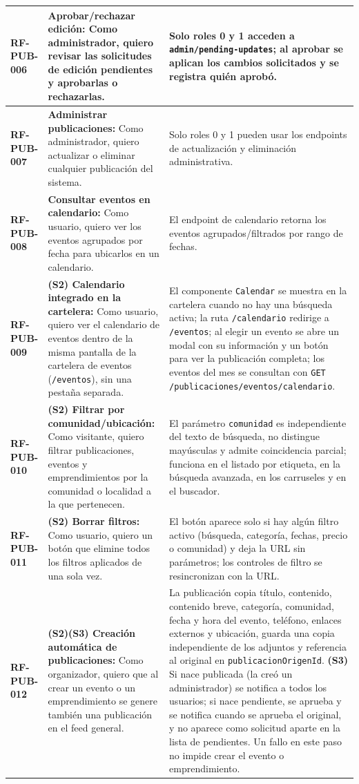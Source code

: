 \begin{longtable}{|l||p{7cm}|p{4.5cm}|}
\hline
\textbf{RF-PUB-006} & \textbf{Aprobar/rechazar edición:} Como administrador, quiero revisar las solicitudes de edición pendientes y aprobarlas o rechazarlas. & Solo roles 0 y 1 acceden a \texttt{admin/pending-updates}; al aprobar se aplican los cambios solicitados y se registra quién aprobó. \\
\hline
\textbf{RF-PUB-007} & \textbf{Administrar publicaciones:} Como administrador, quiero actualizar o eliminar cualquier publicación del sistema. & Solo roles 0 y 1 pueden usar los endpoints de actualización y eliminación administrativa. \\
\hline
\textbf{RF-PUB-008} & \textbf{Consultar eventos en calendario:} Como usuario, quiero ver los eventos agrupados por fecha para ubicarlos en un calendario. & El endpoint de calendario retorna los eventos agrupados/filtrados por rango de fechas. \\
\hline
\textbf{RF-PUB-009} & \textbf{(S2) Calendario integrado en la cartelera:} Como usuario, quiero ver el calendario de eventos dentro de la misma pantalla de la cartelera de eventos (\texttt{/eventos}), sin una pestaña separada. & El componente \texttt{Calendar} se muestra en la cartelera cuando no hay una búsqueda activa; la ruta \texttt{/calendario} redirige a \texttt{/eventos}; al elegir un evento se abre un modal con su información y un botón para ver la publicación completa; los eventos del mes se consultan con \texttt{GET /publicaciones/eventos/calendario}. \\
\hline
\textbf{RF-PUB-010} & \textbf{(S2) Filtrar por comunidad/ubicación:} Como visitante, quiero filtrar publicaciones, eventos y emprendimientos por la comunidad o localidad a la que pertenecen. & El parámetro \texttt{comunidad} es independiente del texto de búsqueda, no distingue mayúsculas y admite coincidencia parcial; funciona en el listado por etiqueta, en la búsqueda avanzada, en los carruseles y en el buscador. \\
\hline
\textbf{RF-PUB-011} & \textbf{(S2) Borrar filtros:} Como usuario, quiero un botón que elimine todos los filtros aplicados de una sola vez. & El botón aparece solo si hay algún filtro activo (búsqueda, categoría, fechas, precio o comunidad) y deja la URL sin parámetros; los controles de filtro se resincronizan con la URL. \\
\hline
\textbf{RF-PUB-012} & \textbf{(S2)(S3) Creación automática de publicaciones:} Como organizador, quiero que al crear un evento o un emprendimiento se genere también una publicación en el feed general. & La publicación copia título, contenido, contenido breve, categoría, comunidad, fecha y hora del evento, teléfono, enlaces externos y ubicación, guarda una copia independiente de los adjuntos y referencia al original en \texttt{publicacionOrigenId}. \textbf{(S3)} Si nace publicada (la creó un administrador) se notifica a todos los usuarios; si nace pendiente, se aprueba y se notifica cuando se aprueba el original, y no aparece como solicitud aparte en la lista de pendientes. Un fallo en este paso no impide crear el evento o emprendimiento. \\

\end{longtable}

